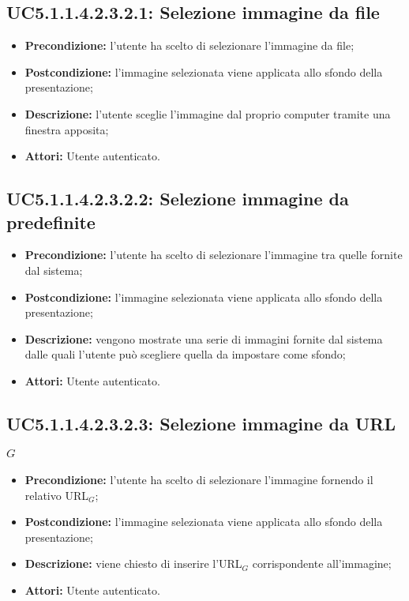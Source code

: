 \subsection{ UC5.1.1.4.2.3.2.1: Selezione immagine da file}

\begin{itemize}
	\item \textbf{Precondizione:} l’utente ha scelto di selezionare l’immagine da file;
	\item \textbf{Postcondizione:} l’immagine selezionata viene applicata allo sfondo della presentazione;
	\item \textbf{Descrizione:} l’utente sceglie l’immagine dal proprio computer tramite una finestra apposita;
	\item \textbf{Attori:} Utente autenticato.
\end{itemize}
\subsection{ UC5.1.1.4.2.3.2.2: Selezione immagine da predefinite}

\begin{itemize}
	\item \textbf{Precondizione:} l’utente ha scelto di selezionare l’immagine tra quelle fornite dal sistema;
	\item \textbf{Postcondizione:} l’immagine selezionata viene applicata allo sfondo della presentazione;
	\item \textbf{Descrizione:} vengono mostrate una serie di immagini fornite dal sistema dalle quali l’utente può scegliere quella da impostare come sfondo;
	\item \textbf{Attori:} Utente autenticato.
\end{itemize}
\subsection{ UC5.1.1.4.2.3.2.3: Selezione immagine da URL$_G$}

\begin{itemize}
	\item \textbf{Precondizione:} l’utente ha scelto di selezionare l’immagine fornendo il relativo URL$_G$;
	\item \textbf{Postcondizione:} l’immagine selezionata viene applicata allo sfondo della presentazione;
	\item \textbf{Descrizione:} viene chiesto di inserire l’URL$_G$ corrispondente all’immagine;
	\item \textbf{Attori:} Utente autenticato.
\end{itemize}

